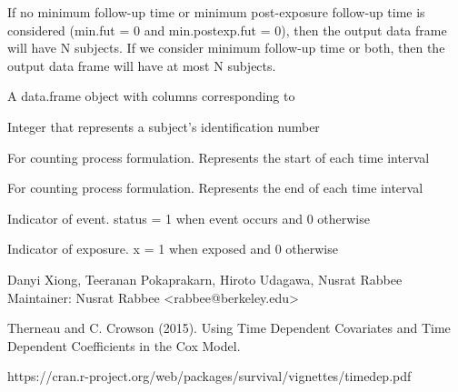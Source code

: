 \documentclass[a4paper]{book}
\begin{document}
%
\begin{Details}\relax

If no minimum follow-up time or minimum post-exposure follow-up time is considered (min.fut = 0 and min.postexp.fut = 0), then the output data frame
will have N subjects. If we consider minimum follow-up time or both, then the
output data frame will have at most N subjects. 
\end{Details}
%
\begin{Value}





A data.frame object with columns corresponding to
\begin{ldescription}
\item[\code{id}] 
Integer that represents a subject's identification number

\item[\code{start}] 
For counting process formulation. Represents the start of each time interval

\item[\code{stop}] 
For counting process formulation. Represents the end of each time interval

\item[\code{status}] 
Indicator of event. status = 1 when event occurs and 0 otherwise

\item[\code{x}] 
Indicator of exposure. x = 1 when exposed and 0 otherwise

\end{ldescription}
\end{Value}
%
\begin{Author}\relax
Danyi Xiong, Teeranan Pokaprakarn, Hiroto Udagawa, Nusrat Rabbee \\{}
Maintainer: Nusrat Rabbee <rabbee@berkeley.edu>
\end{Author}
%
\begin{References}\relax

Therneau and C. Crowson (2015). Using Time Dependent Covariates and Time Dependent Coefficients in the Cox Model.

https://cran.r-project.org/web/packages/survival/vignettes/timedep.pdf
\end{References}
%
\end{document}
